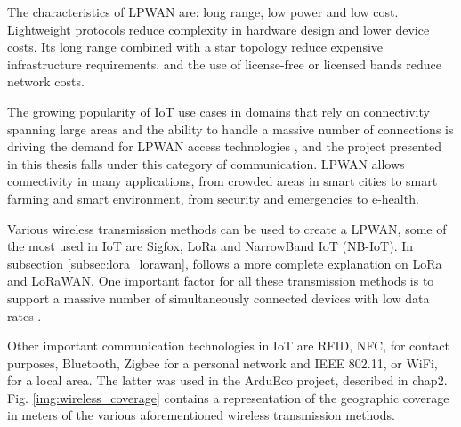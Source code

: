		The characteristics of LPWAN are: long range, low power and low cost.
		Lightweight protocols reduce complexity in hardware design and lower device costs. Its long range combined with a star topology reduce expensive infrastructure requirements, and the use of license-free or licensed bands reduce network costs.
	
		The growing popularity of IoT use cases in domains that rely on connectivity spanning large areas and the ability to handle a massive number of connections is driving the demand for LPWAN access technologies \cite{fi12030046}, and the project presented in this thesis falls under this category of communication.
		LPWAN allows connectivity in many applications, from crowded areas in smart cities to smart farming and smart environment, from security and emergencies to e-health.
		
		Various wireless transmission methods can be used to create a LPWAN, some of the most used in IoT are Sigfox, LoRa and NarrowBand IoT (NB-IoT).
		In subsection \ref{subsec:lora_lorawan}, follows a more complete explanation on LoRa and LoRaWAN.
		One important factor for all these transmission methods is to support a massive number of simultaneously connected devices with low data rates \cite{fi12030046}.
		
		Other important communication technologies in IoT are RFID, NFC, for contact purposes, Bluetooth, Zigbee for a personal network and IEEE 802.11, or WiFi, for a local area.
		The latter was used in the ArduEco project, described in chap2.
		Fig. \ref{img:wireless_coverage} contains a representation of the geographic coverage in meters of the various aforementioned wireless transmission methods.
	
